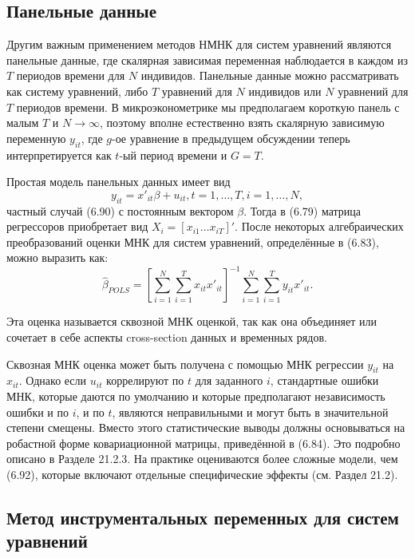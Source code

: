 \subsection{Панельные данные}

Другим важным применением методов НМНК для систем уравнений являются панельные данные, где скалярная зависимая переменная наблюдается в каждом из $T$ периодов времени для $N$ индивидов. Панельные данные можно рассматривать как систему уравнений, либо $T$ уравнений для $N$ индивидов или $N$ уравнений для $T$ периодов времени. В микроэконометрике мы предполагаем короткую панель с малым $T$ и $N \rightarrow \infty$, поэтому вполне естественно взять скалярную зависимую переменную $y_{it}$, где $g$-ое уравнение в предыдущем обсуждении теперь интерпретируется как $t$-ый период времени и $G=T$.

Простая модель панельных данных имеет вид
\begin{equation}
y_{it}=x'_{it} \beta + u_{it}, t=1, \dots, T, i=1, \dots, N,
\end{equation}
частный случай (6.90) с постоянным вектором $\beta$. Тогда в (6.79) матрица регрессоров приобретает вид $X_i=[x_{i1} \dots x_{iT}]'$. После некоторых алгебраических преобразований оценки МНК для систем уравнений, определённые в (6.83), можно выразить как:
\begin{equation}
\hat{\beta}_{POLS}= \left[ \sum_{i=1}^{N} \sum_{i=1}^{T} x_{it} x'_{it} \right]^{-1} \sum_{i=1}^{N} \sum_{i=1}^{T} y_{it}x'_{it}.
\end{equation}

Эта оценка называется сквозной МНК оценкой, так как она объединяет или сочетает в себе аспекты cross-section данных и временных рядов.

Сквозная МНК оценка может быть получена с помощью МНК регрессии  $y_{it}$ на $x_{it}$. Однако
если $u_{it}$ коррелируют по $t$ для заданного $i$, стандартные ошибки МНК, которые даются по умолчанию и которые предполагают независимость ошибки и по $i$, и по $t$, являются неправильными и могут быть в значительной степени смещены. Вместо этого статистические выводы должны основываться на робастной форме  ковариационной матрицы, приведённой в (6.84). Это подробно описано в Разделе 21.2.3. На практике оцениваются более сложные модели, чем (6.92), которые включают отдельные специфические эффекты (см. Раздел 21.2).

\subsection{Метод инструментальных переменных для систем уравнений}

